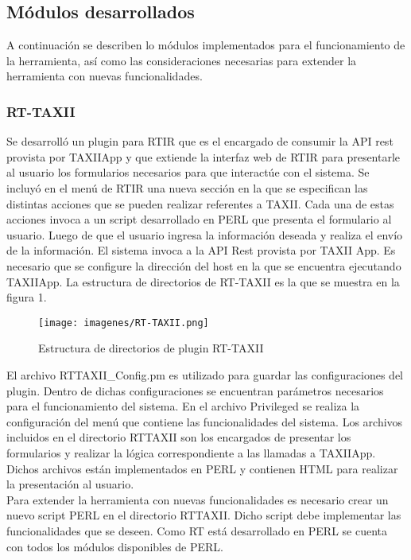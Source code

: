 \documentclass[11pt]{article}
\begin{document}
\subsection{Módulos desarrollados}
A continuación se describen lo módulos implementados para el funcionamiento de la herramienta, así como las consideraciones necesarias para extender la herramienta con nuevas funcionalidades.

\subsubsection{RT-TAXII}
Se desarrolló un plugin para RTIR que es el encargado de consumir la API rest provista por TAXIIApp y que extiende la interfaz web de RTIR para presentarle al usuario los formularios necesarios para que interactúe con el sistema.
Se incluyó en el menú de RTIR una nueva sección en la que se especifican las distintas acciones que se pueden realizar referentes a TAXII.
Cada una de estas acciones invoca a un script desarrollado en PERL que presenta el formulario al usuario.
Luego de que el usuario ingresa la información deseada y realiza el envío de la información. El sistema invoca a la API Rest provista por TAXII App.
Es necesario que se configure la dirección del host en la que se encuentra ejecutando TAXIIApp.
La estructura de directorios de RT-TAXII es la que se muestra en la figura 1.\\

\begin{figure}[h!]
	\centering
	\texttt{[image: imagenes/RT-TAXII.png]}
	\caption{Estructura de directorios de plugin RT-TAXII}
	\label{fig.rt_taxii}
\end{figure}

El archivo RTTAXII\_Config.pm es utilizado para guardar las configuraciones del plugin. Dentro de dichas configuraciones se encuentran parámetros necesarios para el funcionamiento del sistema.
En el archivo Privileged se realiza la configuración del menú que contiene las funcionalidades del sistema.
Los archivos incluidos en el directorio RTTAXII son los encargados de presentar los formularios y realizar la lógica correspondiente a las llamadas a TAXIIApp. Dichos archivos están implementados en PERL y contienen HTML para realizar la presentación al usuario.\\

Para extender la herramienta con nuevas funcionalidades es necesario crear un nuevo script PERL en el directorio RTTAXII. Dicho script debe implementar las funcionalidades que se deseen. Como RT está desarrollado en PERL se cuenta con todos los módulos disponibles de PERL.
\end{document}
